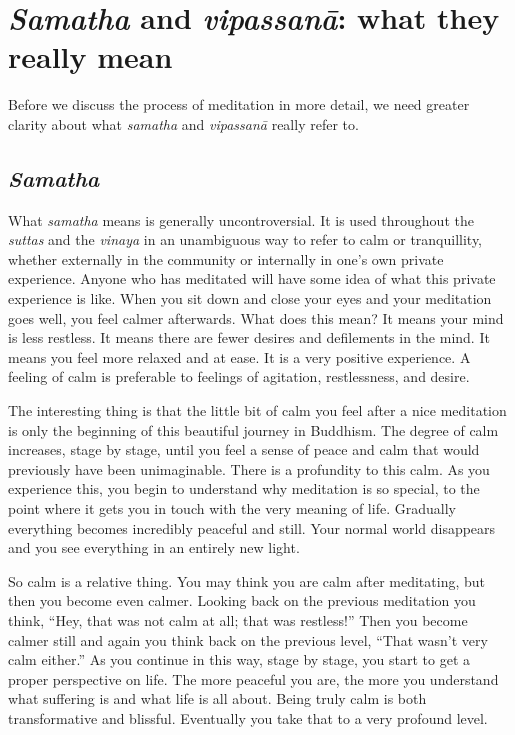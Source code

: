 \documentclass[12pt,openany]{book}
\begin{document}
\chapter*{\textit{Samatha} and \textit{vipassanā}: what they really mean}

Before we discuss the process of meditation in more detail, we need greater clarity about what \textit{samatha} and \textit{vipassanā} really refer to.

\section*{\textit{Samatha}}

What \textit{samatha} means is generally uncontroversial. It is used throughout the \textit{suttas} and the \textit{vinaya} in an unambiguous way to refer to calm or tranquillity, whether externally in the community or internally in one’s own private experience. Anyone who has meditated will have some idea of what this private experience is like. When you sit down and close your eyes and your meditation goes well, you feel calmer afterwards. What does this mean? It means your mind is less restless. It means there are fewer desires and defilements in the mind. It means you feel more relaxed and at ease. It is a very positive experience. A feeling of calm is preferable to feelings of agitation, restlessness, and desire.

The interesting thing is that the little bit of calm you feel after a nice meditation is only the beginning of this beautiful journey in Buddhism. The degree of calm increases, stage by stage, until you feel a sense of peace and calm that would previously have been unimaginable. There is a profundity to this calm. As you experience this, you begin to understand why meditation is so special, to the point where it gets you in touch with the very meaning of life. Gradually everything becomes incredibly peaceful and still. Your normal world disappears and you see everything in an entirely new light.

So calm is a relative thing. You may think you are calm after meditating, but then you become even calmer. Looking back on the previous meditation you think, “Hey, that was not calm at all; that was restless!” Then you become calmer still and again you think back on the previous level, “That wasn’t very calm either.” As you continue in this way, stage by stage, you start to get a proper perspective on life. The more peaceful you are, the more you understand what suffering is and what life is all about. Being truly calm is both transformative and blissful. Eventually you take that to a very profound level.
\end{document}
